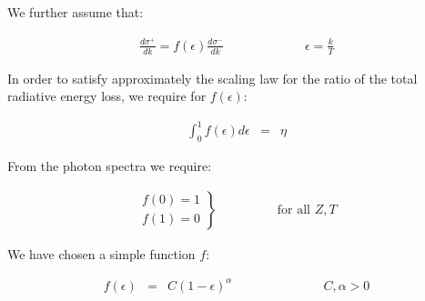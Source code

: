 We further assume that:

\begin{eqnarray}
\frac{d\sigma^+}{dk} = f(\epsilon) \frac{d\sigma^-}{dk} 
& \hspace{2cm} & 
\epsilon = \frac{k}{T}
\label{eq:phys340-3}
\end{eqnarray}

In order to satisfy approximately the scaling law for the ratio
of the total radiative energy loss, we require for $f(\epsilon)$:

\begin{eqnarray}
\int^{1}_{0}{f(\epsilon)d\epsilon} & = & \eta
\label{eq:phys340-4}
\end{eqnarray}

From the photon spectra we require:

\begin{eqnarray}
\left . 
\begin{array}{l}
f(0) = 1 \\
f(1) = 0  
\end{array}
\right \} \hspace{2cm} \mbox{for all $Z,T$}
\label{eq:phys340-5}
\end{eqnarray}

We have chosen a simple function $f$:

\begin{eqnarray}
f(\epsilon) & = & C (1-\epsilon)^{\alpha} \hspace{3cm} C,\alpha > 0
\label{eq:phys340-6}
\end{eqnarray}

